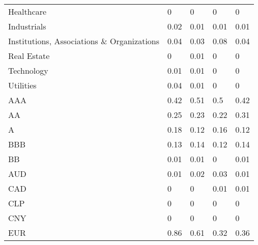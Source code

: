 \begin{table}[H]
\begin{tabular}{lllll}
Healthcare & \cellcolor[HTML]{FCFCFF}0 & \cellcolor[HTML]{FCFCFF}0 & \cellcolor[HTML]{FCFCFF}0 & \cellcolor[HTML]{FCFCFF}0 \\
Industrials & \cellcolor[HTML]{F9FBFD}0.02 & \cellcolor[HTML]{FBFCFE}0.01 & \cellcolor[HTML]{FBFCFE}0.01 & \cellcolor[HTML]{FBFCFE}0.01 \\
Institutions,   Associations \& Organizations & \cellcolor[HTML]{F6FAFA}0.04 & \cellcolor[HTML]{F8FBFB}0.03 & \cellcolor[HTML]{F0F7F5}0.08 & \cellcolor[HTML]{F6FAFA}0.04 \\
Real Estate & \cellcolor[HTML]{FCFCFF}0 & \cellcolor[HTML]{FBFCFE}0.01 & \cellcolor[HTML]{FCFCFF}0 & \cellcolor[HTML]{FCFCFF}0 \\
Technology & \cellcolor[HTML]{FBFCFE}0.01 & \cellcolor[HTML]{FBFCFE}0.01 & \cellcolor[HTML]{FCFCFF}0 & \cellcolor[HTML]{FCFCFF}0 \\
Utilities & \cellcolor[HTML]{F6FAFA}0.04 & \cellcolor[HTML]{FBFCFE}0.01 & \cellcolor[HTML]{FCFCFF}0 & \cellcolor[HTML]{FCFCFF}0 \\
AAA & \cellcolor[HTML]{BCE2C7}0.42 & \cellcolor[HTML]{AEDDBB}0.51 & \cellcolor[HTML]{AFDDBD}0.5 & \cellcolor[HTML]{BCE2C7}0.42 \\
AA & \cellcolor[HTML]{D6EDDE}0.25 & \cellcolor[HTML]{D9EEE1}0.23 & \cellcolor[HTML]{DAEFE2}0.22 & \cellcolor[HTML]{CDE9D6}0.31 \\
A & \cellcolor[HTML]{E1F1E7}0.18 & \cellcolor[HTML]{EAF5EF}0.12 & \cellcolor[HTML]{E4F2EA}0.16 & \cellcolor[HTML]{EAF5EF}0.12 \\
BBB & \cellcolor[HTML]{E8F4EE}0.13 & \cellcolor[HTML]{E7F4ED}0.14 & \cellcolor[HTML]{EAF5EF}0.12 & \cellcolor[HTML]{E7F4ED}0.14 \\
BB & \cellcolor[HTML]{FBFCFE}0.01 & \cellcolor[HTML]{FBFCFE}0.01 & \cellcolor[HTML]{FCFCFF}0 & \cellcolor[HTML]{FBFCFE}0.01 \\
AUD & \cellcolor[HTML]{FBFCFE}0.01 & \cellcolor[HTML]{F9FBFD}0.02 & \cellcolor[HTML]{F8FBFB}0.03 & \cellcolor[HTML]{FBFCFE}0.01 \\
CAD & \cellcolor[HTML]{FCFCFF}0 & \cellcolor[HTML]{FCFCFF}0 & \cellcolor[HTML]{FBFCFE}0.01 & \cellcolor[HTML]{FBFCFE}0.01 \\
CLP & \cellcolor[HTML]{FCFCFF}0 & \cellcolor[HTML]{FCFCFF}0 & \cellcolor[HTML]{FCFCFF}0 & \cellcolor[HTML]{FCFCFF}0 \\
CNY & \cellcolor[HTML]{FCFCFF}0 & \cellcolor[HTML]{FCFCFF}0 & \cellcolor[HTML]{FCFCFF}0 & \cellcolor[HTML]{FCFCFF}0 \\
EUR & \cellcolor[HTML]{78C78D}0.86 & \cellcolor[HTML]{9ED6AE}0.61 & \cellcolor[HTML]{CBE8D5}0.32 & \cellcolor[HTML]{C5E6CF}0.36 \\

\end{tabular}
\end{table}
